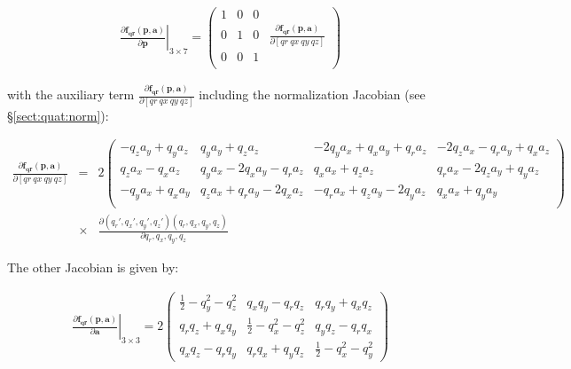 \documentclass[a4paper,11pt]{report}
\begin{document}
\small{
\begin{equation}
 \begin{array}{l}
\left.
\frac{\partial \mathbf{f_{qr}} (\mathbf{p},\mathbf{a})}{\partial \mathbf{p}}
\right|_{3 \times 7} =
  \left(
  \begin{array}{cccc}
    1  & 0 & 0 & ~ \\
    0  & 1 & 0 & \frac{\partial \mathbf{f_{qr}} (\mathbf{p},\mathbf{a})}{\partial [qr ~ qx ~ qy ~ qz]}  \\
    0  & 0 & 1 & ~ \\
  \end{array}
  \right)
 \end{array}
\label{eq:quat_rot_point_func_jacob1}
\end{equation}

\noindent with the auxiliary term $\frac{\partial \mathbf{f_{qr}} (\mathbf{p},\mathbf{a})}{\partial [qr ~ qx ~ qy ~ qz]} $
including the normalization Jacobian (see \S \ref{sect:quat:norm}):

\begin{eqnarray}
\frac{\partial \mathbf{f_{qr}} (\mathbf{p},\mathbf{a})}{\partial [qr ~ qx ~ qy ~ qz]}
  &=&
  2
  \left(
  \begin{array}{ccccccc}
    -q_z a_y +q_y a_z   & q_y a_y + q_z a_z   &   -2q_y a_x + q_x a_y +q_r a_z & -2q_z a_x - q_r a_y +q_x a_z \\
    q_z a_x - q_x a_z   & q_y a_x - 2q_x a_y -q_r a_z  & q_x a_x +q_z a_z   & q_r a_x - 2 q_z a_y +q_y a_z \\
    -q_y a_x + q_x a_y  & q_z a_x + q_r a_y - 2q_x a_z  & -q_r a_x + q_z a_y - 2 q_y a_z  & q_x a_x + q_y a_y \\
  \end{array}
  \right)
   \nonumber \\
  & \times  &
\frac{\partial (q_r',q_x',q_y',q_z')(q_r,q_x,q_y,q_z)}{\partial q_r,q_x,q_y,q_z}
\end{eqnarray}

The other Jacobian is given by:

\begin{equation}
 \begin{array}{l}
\left.
\frac{\partial \mathbf{f_{qr}} (\mathbf{p},\mathbf{a})}{\partial \mathbf{a}}
\right|_{3 \times 3} =
  2
  \left(
  \begin{array}{ccc}
    \frac{1}{2}-q_y^2-q_z^2   & q_x q_y - q_r q_z   & q_r q_y + q_x q_z \\
    q_r q_z + q_x q_y  & \frac{1}{2} - q_x^2-q_z^2  & q_y q_z - q_r q_x \\
    q_x q_z - q_r q_y  & q_r q_x + q_y q_z & \frac{1}{2} - q_x^2-q_y^2
  \end{array}
  \right)
\label{eq:quat_rot_point_func_jacob2}
 \end{array}
\end{equation}
}
\end{document}
